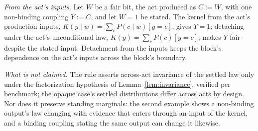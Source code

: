 \emph{From the act's inputs.} Let $W$ be a fair bit, the act produced as $C := W$, with one non-binding coupling $Y := C$, and let $W = 1$ be stated. The kernel from the act's production inputs, $K(y \mid w) = \sum_c P(c \mid w)[y = c]$, gives $Y = 1$; detaching under the act's unconditional law, $K(y) = \sum_c P(c)[y = c]$, makes $Y$ fair despite the stated input. Detachment from the inputs keeps the block's dependence on the act's inputs across the block's boundary.

\emph{What is not claimed.} The rule asserts across-act invariance of the settled law only under the factorization hypothesis of Lemma~\ref{lem:invariance}, verified per benchmark; the opaque case's settled distributions differ across acts by design. Nor does it preserve standing marginals: the second example shows a non-binding output's law changing with evidence that enters through an input of the kernel, and a binding coupling stating the same output can change it likewise.

